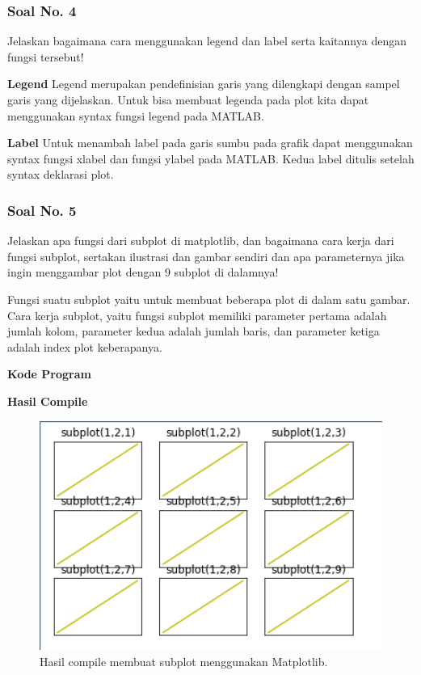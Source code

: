 \subsubsection{Soal No. 4}
\hfill \break
Jelaskan bagaimana cara menggunakan legend dan label serta kaitannya dengan fungsi tersebut!

\textbf{Legend}
Legend merupakan pendefinisian garis yang dilengkapi dengan sampel garis yang dijelaskan. Untuk bisa membuat legenda pada plot kita dapat menggunakan syntax fungsi legend pada MATLAB. 

\textbf{Label}
Untuk menambah label pada garis sumbu pada grafik dapat menggunakan syntax fungsi xlabel dan fungsi ylabel pada MATLAB. Kedua label ditulis setelah syntax deklarasi plot.

\subsubsection{Soal No. 5}
\hfill \break
Jelaskan apa fungsi dari subplot di matplotlib, dan bagaimana cara kerja dari fungsi subplot, sertakan ilustrasi dan gambar sendiri dan apa parameternya jika ingin menggambar plot dengan 9 subplot di dalamnya!

\hfill \break
Fungsi suatu subplot yaitu untuk membuat beberapa plot di dalam satu gambar.
\hfill \break
Cara kerja subplot, yaitu fungsi subplot memiliki parameter pertama adalah jumlah kolom, parameter kedua adalah jumlah baris, dan parameter ketiga adalah index plot keberapanya.

\hfill \break
\textbf{Kode Program}



\hfill \break
\textbf{Hasil Compile}

\begin{figure}[H]
	\includegraphics[width=12cm]{figures/6/1174017/subplot.png}
	\centering
	\caption{Hasil compile membuat subplot menggunakan Matplotlib.}
\end{figure}

